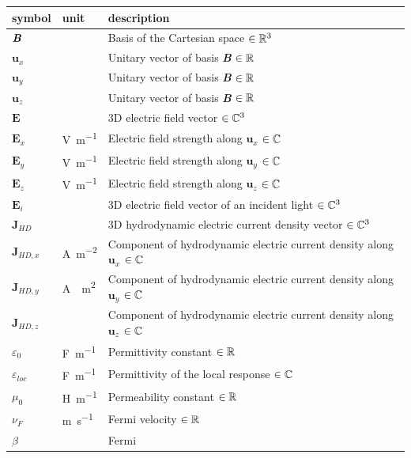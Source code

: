 \documentclass[12pt]{article}
\begin{document}
	\renewcommand{\arraystretch}{1.2} %
	\noindent \begin{longtable*}{l l p{12cm}} \toprule \textbf{symbol} &
		\textbf{unit} & \textbf{description}\\ \midrule $\textbf{\textit{B}}$ &   &
		Basis of the Cartesian space $\in \Bbb R^3$ \\ $\textbf{u}_x$ & & Unitary vector
		of basis \textbf{\textit{B}} $\in \Bbb R$ \\ $\textbf{u}_y$ & & Unitary vector
		of basis \textbf{\textit{B}} $\in \Bbb R$ \\ $\textbf{u}_z$ & & Unitary vector
		of basis \textbf{\textit{B}} $\in \Bbb R$ \\ $\textbf{E}$ &   & 3D electric
		field vector $\in \Bbb C^3$ \\ $\textbf{E}_x$ & \si{\volt \per \meter} &
		Electric field strength along $\textbf{u}_x$  $\in \Bbb C$ \\ $\textbf{E}_y$ &
		\si{\volt \per \meter} & Electric field strength along $\textbf{u}_y$ $\in \Bbb
		C$ \\ $\textbf{E}_z$ & \si{\volt \per \meter} & Electric field strength along
		$\textbf{u}_z$ $\in \Bbb C$ \\ $\textbf{E}_i$ &   & 3D electric field vector of
		an incident light $\in \Bbb C^3$ \\ $\textbf{J}_{HD}$ &  & 3D hydrodynamic
		electric current density vector $\in \Bbb C^3$ \\ $\textbf{J}_{HD,x}$ &
		\si{\ampere \per \square \meter} & Component of hydrodynamic electric current
		density along $\textbf{u}_x$ $\in \Bbb C$ \\ $\textbf{J}_{HD,y}$ & \si{\ampere
			\per \square \meter} & Component of hydrodynamic electric current density along
		$\textbf{u}_y$ $\in \Bbb C$ \\ $\textbf{J}_{HD,z}$ & \si{\ampere \per \square
			\meter} & Component of hydrodynamic electric current density along
		$\textbf{u}_z$ $\in \Bbb C$ \\ $\varepsilon_0$ & \si{\farad \per \meter} &
		Permittivity constant $\in \Bbb R$ \\ $\varepsilon_{loc}$ & \si{\farad \per
			\meter} & Permittivity  of the local response $\in \Bbb C$ \\ $\mu_0$ &
		\si{\henry \per \meter} & Permeability constant $\in \Bbb R$ \\ $\nu_F$ &
		\si{\meter \per \second} & Fermi velocity $\in \Bbb R$ \\ $\beta$ &  &Fermi

\end{longtable*}
\end{document}
